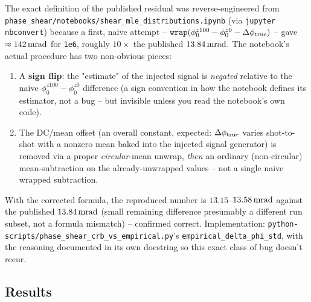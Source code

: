 \documentclass[11pt,a4paper]{article}
\newcommand{\code}[1]{\texttt{#1}}
\begin{document}
The exact definition of the published residual was reverse-engineered from
\code{phase\_shear/notebooks/shear\_mle\_distributions.ipynb} (via
\code{jupyter nbconvert}) because a first, naive attempt --
$\code{wrap}(\phi_0^{z100}-\phi_0^{z0}-\Delta\phi_{\rm true})$ -- gave
$\approx142\,{\rm mrad}$ for \code{1e6}, roughly $10\times$ the published
$13.84\,{\rm mrad}$. The notebook's actual procedure has two non-obvious
pieces:
\begin{enumerate}
  \item A \textbf{sign flip}: the "estimate" of the injected signal is
    \emph{negated} relative to the naive $\phi_0^{z100}-\phi_0^{z0}$
    difference (a sign convention in how the notebook defines its estimator,
    not a bug -- but invisible unless you read the notebook's own code).
  \item The DC/mean offset (an overall constant, expected: $\Delta\phi_{\rm
    true}$ varies shot-to-shot with a nonzero mean baked into the injected
    signal generator) is removed via a proper \emph{circular}-mean unwrap,
    \emph{then} an ordinary (non-circular) mean-subtraction on the
    already-unwrapped values -- not a single naive wrapped subtraction.
\end{enumerate}
With the corrected formula, the reproduced number is $13.15$--$13.58\,{\rm
mrad}$ against the published $13.84\,{\rm mrad}$ (small remaining
difference presumably a different run subset, not a formula mismatch) --
confirmed correct. Implementation:
\code{python-scripts/phase\_shear\_crb\_vs\_empirical.py}'s
\code{empirical\_delta\_phi\_std}, with the reasoning documented in its own
docstring so this exact class of bug doesn't recur.

\subsection{Results}
\label{sec:ps-results}
\end{document}
